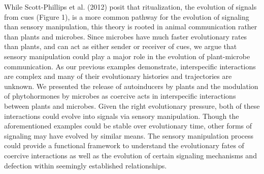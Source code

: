 \documentclass[PhD]{msu-thesis}
\begin{document}
While Scott-Phillips et al. (2012) posit that ritualization, the evolution of signals from cues (Figure 1), is a more common pathway for the evolution of signaling than sensory manipulation, this theory is rooted in animal communication rather than plants and microbes. Since microbes have much faster evolutionary rates than plants, and can act as either sender or receiver of cues, we argue that sensory manipulation could play a major role in the evolution of plant-microbe communication. As our previous examples demonstrate, interspecific interactions are complex and many of their evolutionary histories and trajectories are unknown. We presented the release of autoinducers by plants and the modulation of phytohormones by microbes as coercive acts in interspecific interactions between plants and microbes. Given the right evolutionary pressure, both of these interactions could evolve into signals via sensory manipulation. Though the aforementioned examples could be stable over evolutionary time, other forms of signaling may have evolved by similar means. The sensory manipulation process could provide a functional framework to understand the evolutionary fates of coercive interactions as well as the evolution of certain signaling mechanisms and defection within seemingly established relationships.
\end{document}
